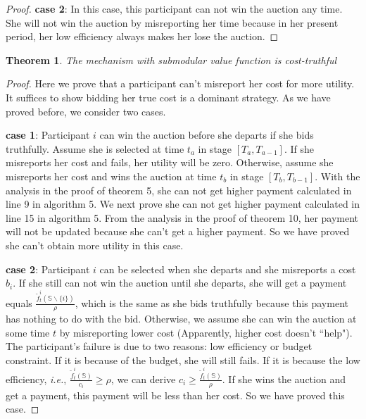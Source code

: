 \documentclass[10pt,journal,letterpaper,compsoc]{IEEEtran}
\newtheorem{theorem}{Theorem}
\newcommand{\ie}{{\em i.e.}}
\begin{document}
\begin{proof}
\textbf{case 2}: In this case, this participant can not win the auction any time. She will not win the auction by misreporting her time because in her present period, her low efficiency always makes her lose the auction.
\end{proof}



\begin{theorem}
The mechanism with submodular value function is cost-truthful
\end{theorem}
\begin{proof}
Here we prove that a participant can't misreport her cost for more utility. It suffices to show bidding her true cost is a dominant strategy. As we have proved before, we consider two cases.

\textbf{case 1}: Participant $i$ can win the auction before she departs if she bids truthfully. Assume she is selected at time $t_a$ in stage $[T_a, T_{a-1}]$. If she misreports her cost and fails, her utility will be zero. Otherwise, assume she misreports her cost and wins the auction at time $t_b$ in stage $[T_b,T_{b-1}]$. With the analysis in the proof of theorem 5, she can not get higher payment calculated in line 9 in algorithm 5. We next prove she can not get higher payment calculated in line 15 in algorithm 5. From the analysis in the proof of theorem 10, her payment will not be updated because she can't get a higher payment. So we have proved she can't obtain more utility in this case.

\textbf{case 2}: Participant $i$ can be selected when she departs and she misreports a cost $b_i$. If she still can not win the auction until she departs, she will get a payment equals $\frac{\tilde{f}^i_t(\mathbb{S}\backslash\{i\})}{\rho}$, which is the same as she bids truthfully because this payment has nothing to do with the bid. Otherwise, we assume she can win the auction at some time $t$ by misreporting lower cost (Apparently, higher cost doesn't ``help"). The participant's failure is due to two reasons: low efficiency or budget constraint. If it is because of the budget, she will still fails. If it is because the low efficiency, \ie, $\frac{\tilde{f}^i_t(\mathbb{S})}{c_i}\ge\rho$, we can derive $c_i \ge \frac{\tilde{f}^i_t(\mathbb{S})}{\rho}$. If she wins the auction and get a payment, this payment will be less than her cost. So we have proved this case.


\end{proof}
\end{document}
